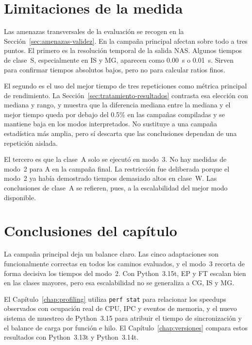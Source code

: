 \section{Limitaciones de la medida}
\label{sec:resultados-limitaciones}

Las amenazas transversales de la evaluación se recogen en la
Sección~\ref{sec:amenazas-validez}. En la campaña principal afectan sobre todo a
tres puntos. El primero es la resolución temporal de la salida NAS. Algunos
tiempos de clase~S, especialmente en IS y MG, aparecen como 0.00~s o 0.01~s.
Sirven para confirmar tiempos absolutos bajos, pero no para calcular ratios
finos.

El segundo es el uso del mejor tiempo de tres repeticiones como métrica principal
de rendimiento. La Sección~\ref{sec:tratamiento-resultados} contrasta esa
elección con mediana y rango, y muestra que la diferencia mediana entre la
mediana y el mejor tiempo queda por debajo del 0.5\% en las campañas compiladas y
se mantiene baja en los modos interpretados. No sustituye a una campaña
estadística más amplia, pero sí descarta que las conclusiones dependan de una
repetición aislada.

El tercero es que la clase~A solo se ejecutó en modo~3. No
hay medidas de modo~2 para A en la campaña final. La restricción fue
deliberada porque el modo~2 ya había demostrado tiempos demasiado altos en
clase~W. Las conclusiones de clase~A se refieren, pues, a la escalabilidad del
mejor modo disponible.


\section{Conclusiones del capítulo}
\label{sec:resultados-conclusiones}

La campaña principal deja un balance claro. Las cinco adaptaciones son
funcionalmente correctas en todos los caminos evaluados, y el modo~3 recorta de
forma decisiva los tiempos del modo~2. Con Python~3.15t, EP y FT escalan bien en
las clases mayores, pero esa escalabilidad no se generaliza a CG, IS y MG.

El Capítulo~\ref{chap:profiling} utiliza \texttt{perf stat} para relacionar
los speedups observados con ocupación real de CPU, IPC y eventos de memoria, y
el nuevo sistema de muestreo de Python~3.15 para atribuir el tiempo de
sincronización y el balance de carga por función e hilo. El
Capítulo~\ref{chap:versiones} compara estos resultados con Python~3.13t y
Python~3.14t.
